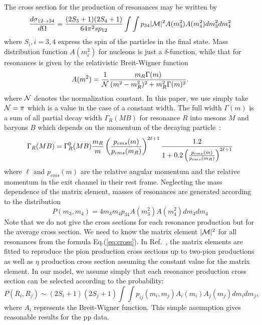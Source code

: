 \documentclass[]{article}
\newcommand{\Mx}{\mbox{${\cal M}$}}                    %
\begin{document}
The cross section for the production of resonances may be written by
\begin{equation}
 \label{eq:cross}
 {d\sigma_{12\to34}\over d\Omega}=
    {(2S_3+1)(2S_4+1)\over 64\pi^2 s p_{12}}
    \int\int p_{34} |\Mx|^2 A(m_3^2)A(m_4^2)dm_3^2dm_4^2
\end{equation}
where $S_i, i=3,4$ express the spin of the particles in the final state.
Mass distribution function $A(m_i^2)$ for nucleons is just a $\delta$-function,
while that for resonances is given
by the relativistic Breit-Wigner function
\begin{equation}
  A(m^2)={1\over \cal N}{m_R\Gamma(m)\over (m^2-m_R^2)^2 + m_R^2\Gamma(m)^2}.
 \label{eq:rlorentz}
\end{equation}
where $\cal N$ denotes the normalization constant.
 In this paper,
we use simply take ${\cal N} = \pi$ which is a value in the case of
a constant width.
The full width $\Gamma(m)$ is a sum of all partial decay width
$\Gamma_R(MB)$ for resonance $R$ into mesons $M$ and baryons $B$
which depends on the momentum of the decaying particle~\cite{rqmd2,urqmd}:
\begin{equation}
 \Gamma_R(MB)=\Gamma^0_R(MB) {m_R\over m}
              \left({p_{cms}(m)\over p_{cms}(m_R)}\right)^{2\ell+1}
   {1.2 \over 1+0.2\left({p_{cms}(m)\over p_{cms}(m_R)}\right)^{2\ell+1}}
   \label{eq:width}
\end{equation}
where $\ell$ and $p_{cms}(m)$ are
 the relative angular momentum
 and 
 the relative momentum in the exit channel in their rest frame.
%
Neglecting the mass dependence of the matrix element,
   masses of resonances are generated according to the distribution
   \begin{equation}
      P(m_3,m_4)= 4m_3m_4 p_{34}A(m_3^2)A(m_4^2)dm_3dm_4
   \end{equation}
%
%
Note that we do not give the cross sections for each resonance production
  but for the average cross section.
We need to know the matrix element $|\Mx|^2$ for all resonances
  from the formula Eq.(\ref{eq:cross}).
In Ref.~\cite{Teis}, the matrix elements are fitted to reproduce
the pion production cross sections up to two-pion productions
 as well as $\eta$ production cross section assuming the constant value
 for the matrix element.
In our model, we assume simply that
 each resonance production cross section can be selected
 according to the probability:
\begin{equation}
  \label{eq:resprob}
  P(R_i,R_j) \sim (2S_i+1)(2S_j+1)\int\int
                    p_{ij}(m_i,m_j)A_i(m_i)A_j(m_j)dm_idm_j ,
\end{equation}
where $A_i$ represents the Breit-Wigner function.
This simple assumption gives reasonable results for the pp data.
\end{document}
